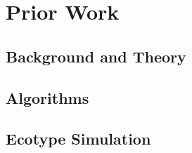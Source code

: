 \chapter{Prior Work}
\section{Background and Theory}
\section{Algorithms}
\section{Ecotype Simulation}
